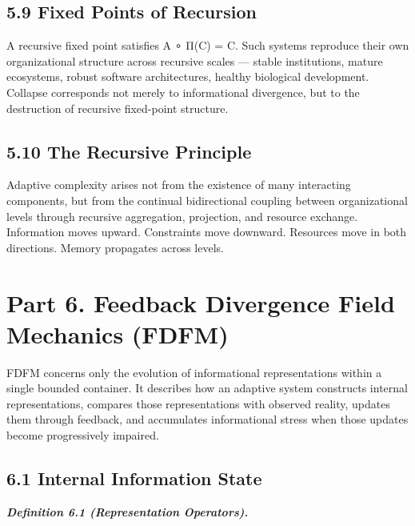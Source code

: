 \documentclass[
]{article}
\begin{document}
\hypertarget{fixed-points-of-recursion}{%
\subsection{5.9 Fixed Points of
Recursion}\label{fixed-points-of-recursion}}

A recursive fixed point satisfies A ∘ Π(C) = C. Such systems reproduce
their own organizational structure across recursive scales --- stable
institutions, mature ecosystems, robust software architectures, healthy
biological development. Collapse corresponds not merely to informational
divergence, but to the destruction of recursive fixed-point structure.

\hypertarget{the-recursive-principle}{%
\subsection{5.10 The Recursive
Principle}\label{the-recursive-principle}}

Adaptive complexity arises not from the existence of many interacting
components, but from the continual bidirectional coupling between
organizational levels through recursive aggregation, projection, and
resource exchange. Information moves upward. Constraints move downward.
Resources move in both directions. Memory propagates across levels.

\hypertarget{part-6.-feedback-divergence-field-mechanics-fdfm}{%
\section{Part 6. Feedback Divergence Field Mechanics
(FDFM)}\label{part-6.-feedback-divergence-field-mechanics-fdfm}}

FDFM concerns only the evolution of informational representations within
a single bounded container. It describes how an adaptive system
constructs internal representations, compares those representations with
observed reality, updates them through feedback, and accumulates
informational stress when those updates become progressively impaired.

\hypertarget{internal-information-state}{%
\subsection{6.1 Internal Information
State}\label{internal-information-state}}

\emph{\textbf{Definition 6.1 (Representation Operators).}}
\end{document}
